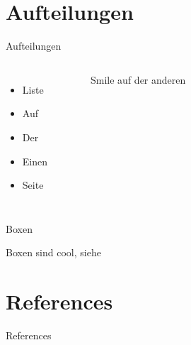 \documentclass[8pt,xcolor={dvipsnames},aspectratio=169]{beamer}
\begin{document}
\section{Aufteilungen}
\begin{frame}{Aufteilungen} 
    \begin{columns}
    \begin{itemize}
        \item Liste
        \item Auf
        \item Der
        \item Einen 
        \item Seite
    \end{itemize}
        \begin{figure}[htpb]
        \begin{center}
        \end{center}
        \caption{Smile auf der anderen}%
        \end{figure}        
\end{columns}
\end{frame}
\begin{frame}{Boxen}
    \begin{tcolorbox}[title=Eine Box]
        Boxen sind cool, siehe\cite{colorman}
    \end{tcolorbox}
\end{frame}
\nocite{*}
\section{References}
\begin{frame}[allowframebreaks]{References}
\printbibliography[heading=none]
\end{frame}
\end{document}

